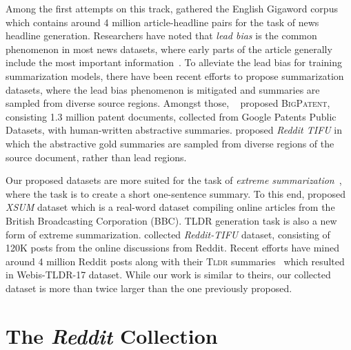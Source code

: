 \documentclass[11pt]{article}
\begin{document}
Among the first attempts on this track, \citet{Rush2015ANA} gathered the English Gigaword corpus~\cite{graff2003english} which contains around 4 million article-headline pairs for the task of news headline generation. Researchers have noted that \textit{lead bias} is the common phenomenon in most news datasets, where early parts of the article generally include the most important information~\cite{Kedzie2018ContentSI, Zhu2019MakeLB, Grenander2019CounteringTE}. To alleviate the lead bias for training summarization models, there have been recent efforts to propose summarization datasets, where the lead bias phenomenon is mitigated and summaries are sampled from diverse source regions. Amongst those, ~\citet{Sharma2019BIGPATENTAL} proposed \textsc{BigPatent}, consisting 1.3 million patent documents, collected from Google Patents Public Datasets, with human-written abstractive summaries. \citet{Kim2019AbstractiveSO} proposed \textit{Reddit TIFU} in which the abstractive gold summaries are sampled from diverse regions of the source document, rather than lead regions. 

Our proposed datasets are more suited for the task of \textit{extreme summarization}~\cite{Narayan2018DontGM, Cachola2020TLDRES}, where the task is to create a short one-sentence summary. To this end, \citet{Narayan2018DontGM} proposed \textit{XSUM} dataset which is a real-word dataset compiling online articles from the British Broadcasting Corporation (BBC). \textsc{TLDR} generation task is also a new form of extreme summarization. \citet{Kim2019AbstractiveSO} collected \textit{Reddit-TIFU} dataset, consisting of 120K posts from the online discussions from Reddit. Recent efforts have mined around 4 million Reddit posts along with their \textsc{Tldr} summaries~\cite{Vlske2017TLDRMR} which resulted in Webis-TLDR-17 dataset. While our work is similar to theirs, our collected dataset is more than twice larger than the one previously proposed. 

\section{The \textit{Reddit} Collection}
\end{document}
